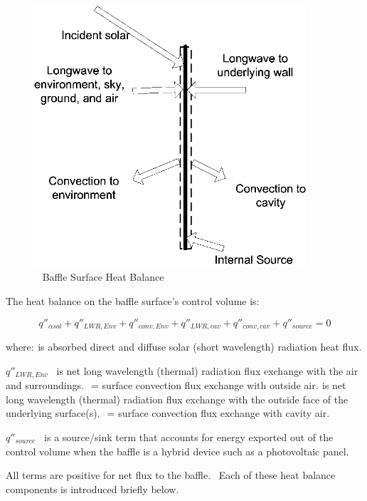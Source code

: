 \begin{figure}[hbtp] %
\centering
\includegraphics[width=0.9\textwidth, height=0.9\textheight, keepaspectratio=true]{media/image438.png}
\caption{  Baffle Surface Heat Balance \protect \label{fig:baffle-surface-heat-balance}}
\end{figure}

The heat balance on the baffle surface's control volume is:

\begin{equation}
{q''_{\alpha sol}} + {q''_{LWR,Env}} + {q''_{conv,Env}} + {q''_{LWR,cav}} + {q''_{conv,cav}} + {q''_{source}} = 0
\end{equation}

where: \(_{ }\)is absorbed direct and diffuse solar (short wavelength) radiation heat flux.

\({q''_{LWR,Env}}\) ~is net long wavelength (thermal) radiation flux exchange with the air and surroundings. \(_{ }\) = surface convection flux exchange with outside air. \(_{ }\)is net long wavelength (thermal) radiation flux exchange with the outside face of the underlying surface(s). \(_{ }\) = surface convection flux exchange with cavity air.

\({q''_{source}}\) ~is a source/sink term that accounts for energy exported out of the control volume when the baffle is a hybrid device such as a photovoltaic panel.

All terms are positive for net flux to the baffle.~ Each of these heat balance components is introduced briefly below.

